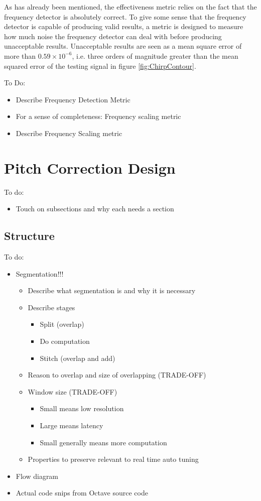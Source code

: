 As has already been mentioned, the effectiveness metric relies on the fact that
the frequency detector is absolutely correct. To give some sense that the
frequency detector is capable of producing valid results, a metric is designed to
measure how much noise the frequency detector can deal with before producing
unacceptable results. Unacceptable results are seen as a mean square error of more
than $0.59 \times 10^{-6}$, i.e. three orders of magnitude greater than the mean
squared error of the testing signal in figure \ref{fig:ChirpContour}.

\color{red}
To Do:
\begin{itemize}
	\item Describe Frequency Detection Metric
	\item For a sense of completeness: Frequency scaling metric
	\item Describe Frequency Scaling metric
\end{itemize}
\color{black}

\section{Pitch Correction Design}

\color{red}
To do:
\begin{itemize}
	\item Touch on subsections and why each needs a section
\end{itemize}
\color{black}

\subsection{Structure}

\color{red}
To do:
\begin{itemize}
	\item Segmentation!!!
	\begin{itemize}
		\item Describe what segmentation is and why it is necessary
		\item Describe stages
		\begin{itemize}
			\item Split (overlap)
			\item Do computation
			\item Stitch (overlap and add)
		\end{itemize}
		\item Reason to overlap and size of overlapping (TRADE-OFF)
		\item Window size (TRADE-OFF)
		\begin{itemize}
			\item Small means low resolution
			\item Large means latency
			\item Small generally means more computation
		\end{itemize}
		\item Properties to preserve relevant to real time auto tuning
	\end{itemize}
	\item Flow diagram
	\item Actual code snips from Octave source code
\end{itemize}
\color{black}

